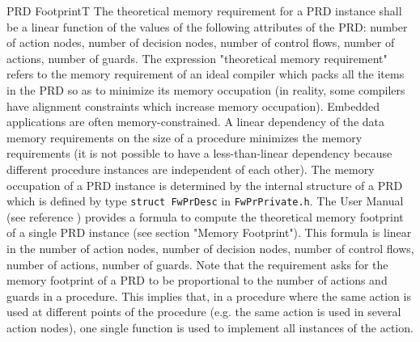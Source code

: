 \documentclass[a4paper,10pt]{article}
\newenvironment{fw_req_note}[7]
{\addtocounter{subsubsection}{1}
	\hspace{0.2cm}\textbf{FW-\arabic{section}.\arabic{subsection}.\arabic{subsubsection}/#2
	\hspace{0.8cm} #1}
	\vspace{-10pt}
\begin{longtable}{p{2.7cm}P{8.5cm}}
\hline
\textsc{Requirement} & #3 \\
\textsc{Note} & #4 \\
\textsc{Justification} & #5 \\
\textsc{Implementation} & #6  \\ 
\textsc{Verification} & #7  \\
\hline
}
{\end{longtable}}
\begin{document}
\begin{fw_req_note}{PRD Footprint}{T}
{The theoretical memory requirement for a PRD instance shall 
be a linear function of the values of the following attributes 
of the PRD: number of action nodes, number of decision nodes, number of control flows, 
number of actions, number of guards.}
{The expression "theoretical memory requirement" refers to the memory requirement 
of an ideal compiler which packs all the items in the PRD so as to minimize its memory 
occupation (in reality, some compilers have alignment constraints which increase memory occupation).}
{Embedded applications are often memory-constrained. A linear 
dependency of the data memory requirements on the size of a procedure minimizes 
the memory requirements (it is not possible to have a less-than-linear dependency 
because different procedure instances are independent of each other).}
{The memory occupation of a PRD instance is determined by the 
internal structure of a PRD which is defined by type 
\texttt{struct FwPrDesc} in \texttt{FwPrPrivate.h}.} 
{The User Manual (see reference \cite{ref:um}) provides a formula to compute the theoretical 
memory footprint of a single PRD instance (see section "Memory Footprint"). 
This formula is linear in the number of action nodes, number of decision nodes, number of 
control flows, number of actions, 
number of guards. 
Note that the requirement asks for the memory footprint of a PRD to 
be proportional to the number of actions and guards in a procedure. 
This implies that, in a procedure where the same action is used at different points 
of the procedure (e.g. the same action is used in several action nodes), one 
single function is used to implement all instances of the action.}
\end{fw_req_note}
\end{document}

